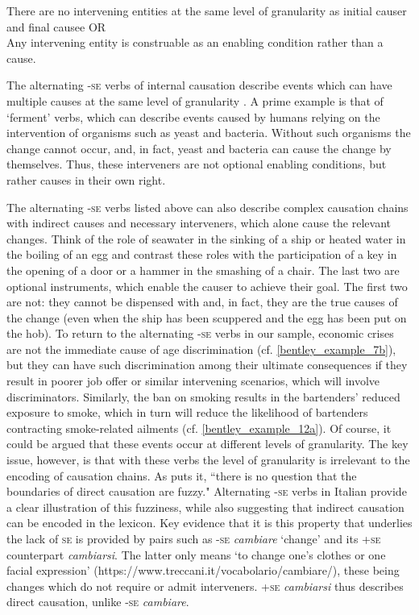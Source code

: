\documentclass[output=paper,colorlinks,citecolor=brown
]{langscibook}
\begin{document}
\ea \label{bentley_example_13}
    \ea \label{bentley_example_13a}
    \glt There are no intervening entities at the same level of granularity as initial causer and final causee 	OR  \\
    \ex \label{bentley_example_13b}
    \glt Any intervening entity is construable as an enabling condition rather than a cause.  \\
    \z
\z

The alternating -\textsc{se} verbs of internal causation describe events which can have multiple causes at the same level of granularity \citep{bentley2023internally}. A prime example is that of ‘ferment’ verbs, which can describe events caused by humans relying on the intervention of organisms such as yeast and bacteria. Without such organisms the change cannot occur, and, in fact, yeast and bacteria can cause the change by themselves. Thus, these interveners are not optional enabling conditions, but rather causes in their own right. 

The alternating -\textsc{se} verbs listed above can also describe complex causation chains with indirect causes and necessary interveners, which alone cause the relevant changes. Think of the role of seawater in the sinking of a ship or heated water in the boiling of an egg and contrast these roles with the participation of a key in the opening of a door or a hammer in the smashing of a chair. The last two are optional instruments, which enable the causer to achieve their goal. The first two are not: they cannot be dispensed with and, in fact, they are the true causes of the change (even when the ship has been scuppered and the egg has been put on the hob). To return to the alternating -\textsc{se} verbs in our sample, economic crises are not the immediate cause of age discrimination (cf. \ref{bentley_example_7b}), but they can have such discrimination among their ultimate consequences if they result in poorer job offer or similar intervening scenarios, which will involve discriminators. Similarly, the ban on smoking results in the bartenders’ reduced exposure to smoke, which in turn will reduce the likelihood of bartenders contracting smoke-related ailments (cf. \ref{bentley_example_12a}). Of course, it could be argued that these events occur at different levels of granularity. The key issue, however, is that with these verbs the level of granularity is irrelevant to the encoding of causation chains. As \citet[477]{kiparsky1997remarks} puts it, “there is no question that the boundaries of direct causation are fuzzy." Alternating -\textsc{se} verbs in Italian provide a clear illustration of this fuzziness, while also suggesting that indirect causation can be encoded in the lexicon. Key evidence that it is this property that underlies the lack of \textsc{se} is provided by pairs such as -\textsc{se} \textit{cambiare} ‘change’ and its +\textsc{se} counterpart \textit{cambiarsi}. The latter only means ‘to change one’s clothes or one facial expression’ (https://www.treccani.it/vocabolario/cambiare/), these being changes which do not require or admit interveners. +\textsc{se} \textit{cambiarsi} thus describes direct causation, unlike -\textsc{se} \textit{cambiare}. 
\end{document}
